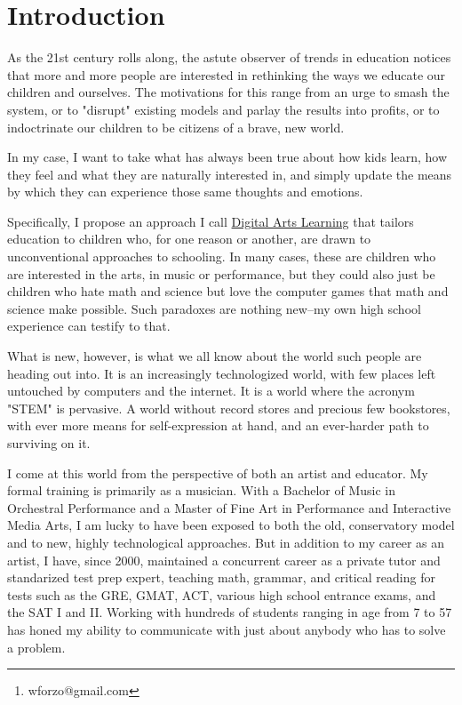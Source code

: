 \documentclass[11pt]{article}
\author{a\thanks{wforzo@gmail.com}}
\date{\today}
\title{}
\begin{document}
\tableofcontents

\section{Introduction}
\label{sec:orgheadline1}
As the 21st century rolls along, the astute observer of trends in education notices that more and more people are interested in rethinking the ways we educate our children and ourselves. The motivations for this range from an urge to smash the system, or to "disrupt" existing models and parlay the results into profits, or to indoctrinate our children to be citizens of a brave, new world.

In my case, I want to take what has always been true about how kids learn, how they feel and what they are naturally interested in, and simply update the means by which they can experience those same thoughts and emotions.

Specifically, I propose an approach I call \uline{Digital Arts Learning}
that tailors education to children who, for one reason or another, are
drawn to unconventional approaches to schooling. In many cases, these
are children who are interested in the arts, in music or performance,
but they could also just be children who hate math and science but
love the computer games that math and science make possible. Such
paradoxes are nothing new--my own high school experience can testify
to that.

What is new, however, is what we all know about the world such people are heading out into. It is an increasingly technologized world, with few places left untouched by computers and the internet. It is a world where the acronym "STEM" is pervasive. A world without record stores and precious few bookstores, with ever more means for self-expression at hand, and an ever-harder path to surviving on it.

I come at this world from the perspective of both an artist and educator. My formal training is primarily as a musician. With a Bachelor of Music in Orchestral Performance and a Master of Fine Art in Performance and Interactive Media Arts, I am lucky to have been exposed to both the old, conservatory model and to new, highly technological approaches. But in addition to my career as an artist, I have, since 2000, maintained a concurrent career as a private tutor and standarized test prep expert, teaching math, grammar, and critical reading for tests such as the GRE, GMAT, ACT, various high school entrance exams, and the SAT I and II. Working with hundreds of students ranging in age from 7 to 57 has honed my ability to communicate with just about anybody who has to solve a problem.
\end{document}
